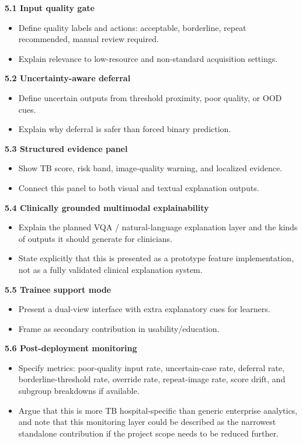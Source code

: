 \documentclass[11pt]{article}
\begin{document}
\textbf{5.1 Input quality gate}
\begin{itemize}[leftmargin=1.5em]
    \item Define quality labels and actions: acceptable, borderline, repeat recommended, manual review required.
    \item Explain relevance to low-resource and non-standard acquisition settings.
\end{itemize}

\textbf{5.2 Uncertainty-aware deferral}
\begin{itemize}[leftmargin=1.5em]
    \item Define uncertain outputs from threshold proximity, poor quality, or OOD cues.
    \item Explain why deferral is safer than forced binary prediction.
\end{itemize}

\textbf{5.3 Structured evidence panel}
\begin{itemize}[leftmargin=1.5em]
    \item Show TB score, risk band, image-quality warning, and localized evidence.
    \item Connect this panel to both visual and textual explanation outputs.
\end{itemize}

\textbf{5.4 Clinically grounded multimodal explainability}
\begin{itemize}[leftmargin=1.5em]
    \item Explain the planned VQA / natural-language explanation layer and the kinds of outputs it should generate for clinicians.
    \item State explicitly that this is presented as a prototype feature implementation, not as a fully validated clinical explanation system.
\end{itemize}

\textbf{5.5 Trainee support mode}
\begin{itemize}[leftmargin=1.5em]
    \item Present a dual-view interface with extra explanatory cues for learners.
    \item Frame as secondary contribution in usability/education.
\end{itemize}

\textbf{5.6 Post-deployment monitoring}
\begin{itemize}[leftmargin=1.5em]
    \item Specify metrics: poor-quality input rate, uncertain-case rate, deferral rate, borderline-threshold rate, override rate, repeat-image rate, score drift, and subgroup breakdowns if available.
    \item Argue that this is more TB hospital-specific than generic enterprise analytics, and note that this monitoring layer could be described as the narrowest standalone contribution if the project scope needs to be reduced further.
\end{itemize}
\end{document}

